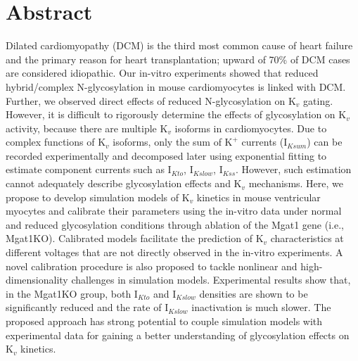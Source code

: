 \documentclass[10pt,letterpaper]{article}
\begin{document}
\section*{Abstract}
Dilated cardiomyopathy (DCM) is the third most common cause of heart failure and the primary reason for heart transplantation; upward of 70\% of DCM cases are considered idiopathic. Our in-vitro experiments showed that reduced hybrid/complex N-glycosylation in mouse cardiomyocytes is linked with DCM. Further, we observed direct effects of reduced N-glycosylation on $\text{K}_{v}$ gating. However, it is difficult to rigorously determine the effects of glycosylation on $\text{K}_{v}$ activity, because there are multiple $\text{K}_{v}$ isoforms in cardiomyocytes. Due to complex functions of $\text{K}_{v}$ isoforms, only the sum of $\text{K}^{+}$ currents ($\text{I}_{Ksum}$) can be recorded experimentally and decomposed later using exponential fitting to estimate component currents such as $\text{I}_{Kto}$, $\text{I}_{Kslow}$, $\text{I}_{Kss}$. However, such estimation cannot adequately describe glycosylation effects and $\text{K}_{v}$ mechanisms. Here, we propose to develop simulation models of $\text{K}_{v}$ kinetics in mouse ventricular myocytes and calibrate their parameters using the in-vitro data under normal and reduced glycosylation conditions through ablation of the Mgat1 gene (i.e., Mgat1KO). Calibrated models facilitate the prediction of $\text{K}_{v}$ characteristics at different voltages that are not directly observed in the in-vitro experiments. A novel calibration procedure is also proposed to tackle nonlinear and high-dimensionality challenges in simulation models. Experimental results show that, in the Mgat1KO group, both $\text{I}_{Kto}$ and $\text{I}_{Kslow}$ densities are shown to be significantly reduced and the rate of $\text{I}_{Kslow}$ inactivation is much slower. The proposed approach has strong potential to couple simulation models with experimental data for gaining a better understanding of glycosylation effects on $\text{K}_{v}$ kinetics.

\end{document}
